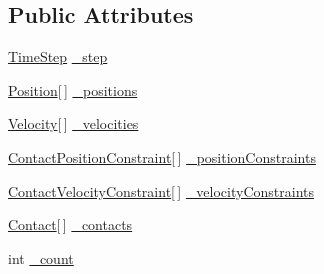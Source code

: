 \subsection*{Public Attributes}
\begin{DoxyCompactItemize}
\item 
\hyperlink{struct_farseer_physics_1_1_dynamics_1_1_time_step}{Time\+Step} \hyperlink{class_farseer_physics_1_1_dynamics_1_1_contacts_1_1_contact_solver_a553d6dc58400d717c71923ab42011d2d}{\+\_\+step}
\item 
\hyperlink{struct_farseer_physics_1_1_dynamics_1_1_position}{Position}\mbox{[}$\,$\mbox{]} \hyperlink{class_farseer_physics_1_1_dynamics_1_1_contacts_1_1_contact_solver_acbad0865c2eeece43b778ecc93c200e1}{\+\_\+positions}
\item 
\hyperlink{struct_farseer_physics_1_1_dynamics_1_1_velocity}{Velocity}\mbox{[}$\,$\mbox{]} \hyperlink{class_farseer_physics_1_1_dynamics_1_1_contacts_1_1_contact_solver_ac7ea6374a8e5143378e7afa44128c0d2}{\+\_\+velocities}
\item 
\hyperlink{class_farseer_physics_1_1_dynamics_1_1_contacts_1_1_contact_position_constraint}{Contact\+Position\+Constraint}\mbox{[}$\,$\mbox{]} \hyperlink{class_farseer_physics_1_1_dynamics_1_1_contacts_1_1_contact_solver_a0561ab41fef1e5a5edee6746c2301153}{\+\_\+position\+Constraints}
\item 
\hyperlink{class_farseer_physics_1_1_dynamics_1_1_contacts_1_1_contact_velocity_constraint}{Contact\+Velocity\+Constraint}\mbox{[}$\,$\mbox{]} \hyperlink{class_farseer_physics_1_1_dynamics_1_1_contacts_1_1_contact_solver_a79e50d0893b382d63029a1bbbae6471e}{\+\_\+velocity\+Constraints}
\item 
\hyperlink{class_farseer_physics_1_1_dynamics_1_1_contacts_1_1_contact}{Contact}\mbox{[}$\,$\mbox{]} \hyperlink{class_farseer_physics_1_1_dynamics_1_1_contacts_1_1_contact_solver_a21630dddc2fc4de973a5a1719371b375}{\+\_\+contacts}
\item 
int \hyperlink{class_farseer_physics_1_1_dynamics_1_1_contacts_1_1_contact_solver_a28a10e8d8fc01b7c7e747e107059a102}{\+\_\+count}
\end{DoxyCompactItemize}



